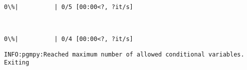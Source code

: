 \documentclass[11pt]{article}
\begin{document}
    \begin{center}
    \end{center}
    { \hspace*{\fill} \\}
    
    
    \begin{Verbatim}[commandchars=\\\{\}]
  0\%|          | 0/5 [00:00<?, ?it/s]
    \end{Verbatim}

    
    \begin{center}
    \end{center}
    { \hspace*{\fill} \\}
    
    
    \begin{Verbatim}[commandchars=\\\{\}]
  0\%|          | 0/4 [00:00<?, ?it/s]
    \end{Verbatim}

    
    \begin{Verbatim}[commandchars=\\\{\}]
INFO:pgmpy:Reached maximum number of allowed conditional variables. Exiting
    \end{Verbatim}

    \begin{center}
    \end{center}
    { \hspace*{\fill} \\}
    
\end{document}
